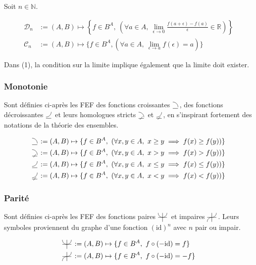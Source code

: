 \documentclass{article}
\newcommand{\R}{{\mathbb R}}
\newcommand{\N}{{\mathbb N}}
\newcommand{\cC}{{\mathcal C}}
\newcommand{\cD}{{\mathcal D}}
\newcommand{\increasingfunctions}{%
	\begin{tikzpicture}[scale=1.75, baseline=0]%
		\draw (0,-0.25ex) -- (1ex,-0.25ex);%
		\draw (1ex,0) arc (0:90:1ex);%
	\end{tikzpicture}\,%
}
\newcommand{\strictlyincreasingfunctions}{%
	\begin{tikzpicture}[scale=1.75, baseline=0]%
		\draw (0,-0.25ex) -- (1ex,-0.25ex);%
		\draw (1ex,0) arc (0:90:1ex);%
		\draw (0.75ex,0.125ex) -- (0.25ex,-0.5ex);%
	\end{tikzpicture}\,%
}
\newcommand{\decreasingfunctions}{%
	\begin{tikzpicture}[scale=1.75, baseline=0]%
		\draw (0,-0.25ex) -- (1ex,-0.25ex);%
		\draw (0,0) arc (-90:0:1ex);%
	\end{tikzpicture}\,%
}
\newcommand{\strictlydecreasingfunctions}{%
	\begin{tikzpicture}[scale=1.75, baseline=0]%
		\draw (0,-0.25ex) -- (1ex,-0.25ex);%
		\draw (0,0) arc (-90:0:1ex);%
		\draw (0.75ex,0.125ex) -- (0.25ex,-0.5ex);%
	\end{tikzpicture}\,%
}
\newcommand{\evenfunctions}{%
	\begin{tikzpicture}[scale=1.5, baseline=-0.5ex]%
		\draw (-1ex,0) -- (1ex,0);%
		\draw (0,-1ex) -- (0, 1ex);%
		\draw (0ex, 0ex) arc (-90:0:1ex);%
		\draw (0ex, 0ex) arc (90:0:-1ex);%
	\end{tikzpicture}\,%
}
\newcommand{\oddfunctions}{%
	\begin{tikzpicture}[scale=1.5, baseline=-0.5ex]%
		\draw (-1ex,0) -- (1ex,0);%
		\draw (0,-1ex) -- (0, 1ex);%
		\draw (0ex, 0ex) arc (-90:0:1ex);%
		\draw (0ex, 0ex) arc (-90:0:-1ex);%
	\end{tikzpicture}\,%
}
\begin{document}
Soit $n \in \N$.

\begin{align}
	\cD_n &:= (A, B) \mapsto  \left\{ f \in B^A,\ \left(\forall a\in A,\ \lim_{\epsilon \to 0} \frac{f(a+\epsilon)-f(a)}{\epsilon} \in \R\right)\right\}  \\
	\cC_n &:= (A, B) \mapsto \{ f\in B^A, \left( \forall a\in A,\ \lim_{\epsilon \to a} f(\epsilon) = a \right)  \} 
\end{align}

Dans (1), la condition sur la limite implique également que la limite doit exister.

\subsubsection{Monotonie}

Sont définies ci-après les FEF des fonctions croissantes $\increasingfunctions$, des fonctions décroissantes $\decreasingfunctions$ et leurs homologues stricts $\strictlyincreasingfunctions$ et $\strictlydecreasingfunctions$, en s'inspirant fortement des notations de la théorie des ensembles.

\begin{align*}
	\increasingfunctions &:= (A, B) \mapsto \{ f\in B^A,\ (\forall x,y\in A,\ x \ge y \implies f(x) \ge f(y)) \} \\
	\strictlyincreasingfunctions &:= (A, B) \mapsto \{ f\in B^A,\ (\forall x,y\in A,\ x > y \implies f(x) > f(y)) \} \\
	\decreasingfunctions &:= (A, B) \mapsto \{ f\in B^A,\ (\forall x,y\in A,\ x \le y \implies f(x) \le f(y)) \} \\
	\strictlydecreasingfunctions &:= (A, B) \mapsto \{ f\in B^A,\ (\forall x,y\in A,\ x < y \implies f(x) < f(y)) \} \\
\end{align*}

\subsubsection{Parité}
Sont définies ci-après les FEF des fonctions paires $\evenfunctions$ et impaires $\oddfunctions$. Leurs symboles proviennent du graphe d'une fonction $(\text{id})^n$ avec $n$ pair ou impair.

\begin{align*}
	\evenfunctions &:= (A, B) \mapsto \{ f\in B^A,\ f \circ (-\text{id}) = f \} \\
	\oddfunctions &:= (A, B) \mapsto \{ f\in B^A,\ f \circ (-\text{id}) = -f \} 
\end{align*}
\end{document}
